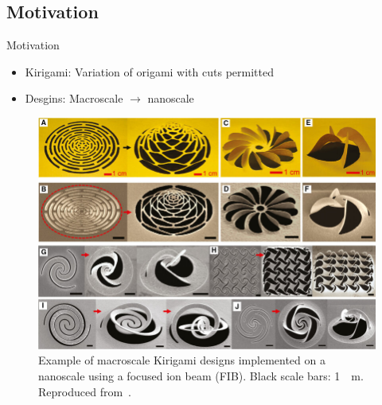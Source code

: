 \documentclass[
	10pt, %
]{beamer}
\begin{document}
\subsection{Motivation}


\begin{frame}{Motivation}

	\begin{itemize}
		\item Kirigami: Variation of origami with cuts permitted
		\item Desgins: Macroscale $\to$ nanoscale
	\end{itemize}
	\vspace*{10px}

	\begin{figure}
		\includegraphics[height=0.55\textheight]{figures/kirigami_example.jpg}
		\caption{Example of macroscale Kirigami designs implemented on a nanoscale using a focused ion beam (FIB). Black scale bars: \SI{1}{\mu m}. Reproduced from~\cite{Li_2018}.}
	\end{figure}	
\end{frame}
\end{document}
